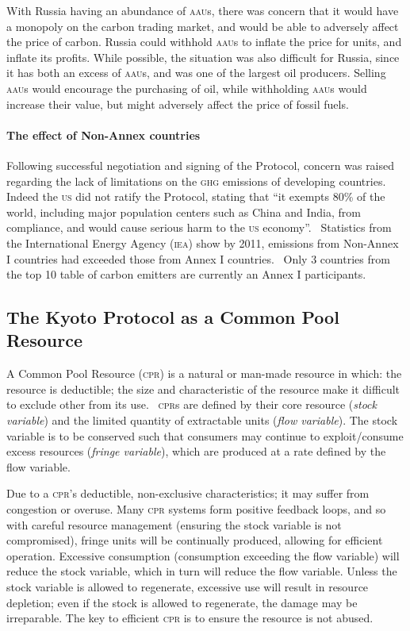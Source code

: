 With Russia having an abundance of \textsc{aau}s, there was concern that it would have a monopoly on the carbon trading market, and would be able to adversely affect the price of carbon. Russia could withhold \textsc{aau}s to inflate the price for units, and inflate its profits. While possible, the situation was also difficult for Russia, since it has both an excess of \textsc{aau}s, and was one of the largest oil producers. Selling \textsc{aau}s would encourage the purchasing of oil, while withholding \textsc{aau}s would increase their value, but might adversely affect the price of fossil fuels.

\paragraph{The effect of Non-Annex countries}

Following successful negotiation and signing of the Protocol, concern was raised regarding the lack of limitations on the \textsc{ghg} emissions of developing countries. Indeed the \textsc{us} did not ratify the Protocol, stating that ``it exempts 80\% of the world, including major population centers such as China and India, from compliance, and would cause serious harm to the \textsc{us} economy''.~\cite{Hague-to-Marrakesh} Statistics from the International Energy Agency (\textsc{iea}) show by 2011, emissions from Non-Annex I countries had exceeded those from Annex I countries.~\cite{IEA-highlights} Only 3 countries from the top 10 table of carbon emitters are currently an Annex I participants.

\subsection{The Kyoto Protocol as a Common Pool Resource}

A Common Pool Resource (\textsc{cpr}) is a natural or man-made resource in which: the resource is deductible; the size and characteristic of the resource make it difficult to exclude other from its use.~\cite{Ostrom-90} \textsc{cpr}s are defined by their core resource (\emph{stock variable}) and the limited quantity of extractable units (\emph{flow variable}). The stock variable is to be conserved such that consumers may continue to exploit/consume excess resources (\emph{fringe variable}), which are produced at a rate defined by the flow variable.

Due to a \textsc{cpr}'s deductible, non-exclusive characteristics; it may suffer from congestion or overuse. Many \textsc{cpr} systems form positive feedback loops, and so with careful resource management (ensuring the stock variable is not compromised), fringe units will be continually produced, allowing for efficient operation. Excessive consumption (consumption exceeding the flow variable) will reduce the stock variable, which in turn will reduce the flow variable. Unless the stock variable is allowed to regenerate, excessive use will result in resource depletion; even if the stock is allowed to regenerate, the damage may be irreparable. The key to efficient \textsc{cpr} is to ensure the resource is not abused.


